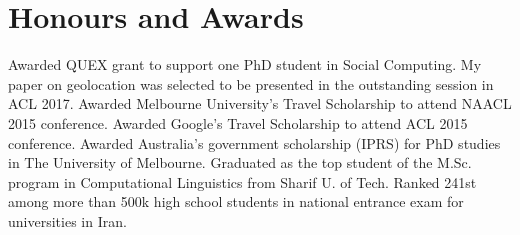 \documentclass[11pt,a4paper,sans]{moderncv} %
\begin{document}



\section{Honours and Awards}
 {Awarded QUEX grant to support one PhD student in Social Computing.}
   {My paper on geolocation was selected to be presented in the outstanding session in ACL 2017.}
   {Awarded Melbourne University's Travel Scholarship to attend NAACL 2015 conference.}
   {Awarded Google's Travel Scholarship to attend ACL 2015 conference.}
   {Awarded Australia's government scholarship (IPRS) for PhD studies in The University of Melbourne.}
   {Graduated as the top student of the M.Sc. program in Computational Linguistics from Sharif U. of Tech.}
   {Ranked 241st among more than 500k high school students in national entrance exam for universities in Iran.}




\end{document}
